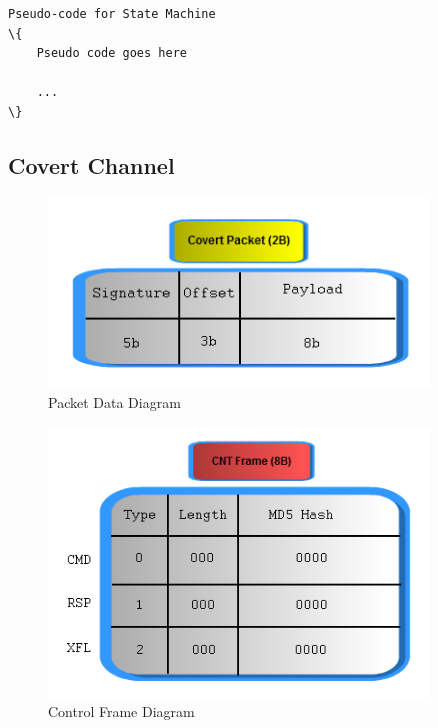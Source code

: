 \documentclass[titlepage]{article}
\begin{document}
\begin{lstlisting}
Pseudo-code for State Machine
\{
	Pseudo code goes here

	...
\}
\end{lstlisting}

\clearpage

\subsection{Covert Channel}

\begin{figure}[htb]                                                                       
  \begin{center}
    \includegraphics[width=0.9\textwidth]{imgs/packet.png}
  \end{center}
  \caption{Packet Data Diagram}
  \label{fig:packet}
\end{figure}

\begin{figure}[htb]                                                                       
  \begin{center}
    \includegraphics[width=0.9\textwidth]{imgs/frame.png}
  \end{center}
  \caption{Control Frame Diagram}
  \label{fig:frame}
\end{figure}
\end{document}
